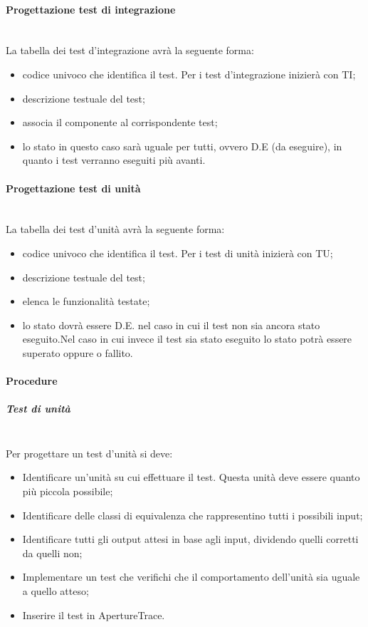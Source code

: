 \paragraph{Progettazione test di integrazione} \hfill \\
La tabella dei test d'integrazione avrà la seguente forma:
\begin{itemize}
\item {}codice univoco che identifica il test. Per i test d'integrazione inizierà con TI;
\item {} descrizione testuale del test;
\item {} associa il componente al corrispondente test;
\item {}lo stato in questo caso sarà uguale per tutti, ovvero D.E (da eseguire), in quanto i test verranno eseguiti più avanti.
\end{itemize}

\paragraph{Progettazione test di unità} \hfill \\
La tabella dei test d'unità avrà la seguente forma:
\begin{itemize}
\item {}codice univoco che identifica il test. Per i test di unità inizierà con TU;
\item {} descrizione testuale del test;
\item {} elenca le funzionalità testate;
\item {}lo stato dovrà essere D.E. nel caso in cui il test non sia ancora stato eseguito.Nel caso in cui invece il test sia stato eseguito lo stato potrà essere superato oppure o fallito.
\end{itemize}

\paragraph{Procedure}

\subparagraph{Test di unità} \hfill \\
Per progettare un test d'unità si deve:
\begin{itemize}
\item Identificare un'unità su cui effettuare il test. Questa unità deve essere quanto più piccola possibile;
\item Identificare delle classi di equivalenza che rappresentino tutti i possibili input;
\item Identificare tutti gli output attesi in base agli input, dividendo quelli corretti da quelli non;
\item Implementare un test che verifichi che il comportamento dell'unità sia uguale a quello atteso;
\item Inserire il test in ApertureTrace.
\end{itemize}

